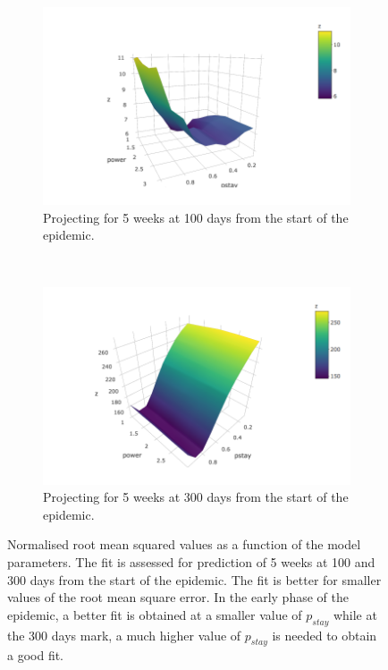 \documentclass[11pt,]{article}
\begin{document}
\begin{figure}
  \centering
  \begin{subfigure}[b]{0.4\textwidth}
    \includegraphics[]{ms6-figures/rms-100-2}
    \caption{Projecting for 5 weeks at 100 days from the start of the epidemic.}
    \label{fig:rms-100}
\end{subfigure}
~
  \begin{subfigure}[b]{0.4\textwidth}
    \includegraphics[]{ms6-figures/rms-300-2}
    \caption{Projecting for 5 weeks at 300 days from the start of the epidemic.}    
    \label{fig:rms-300}
\end{subfigure}
  \caption[RMS as a function of model parameters]{Normalised root mean
    squared values as a function of the model parameters. The fit is
    assessed for prediction of 5 weeks at 100 and 300 days from the start of
    the epidemic. The fit is better for smaller values of the root
    mean square error. In the early phase of the epidemic, a better
    fit is obtained at a smaller value of $p_{stay}$ while at the 300
    days mark, a much higher value of $p_{stay}$ is needed to obtain a
  good fit.}
  \label{fig:rms}
\end{figure}
\end{document}
